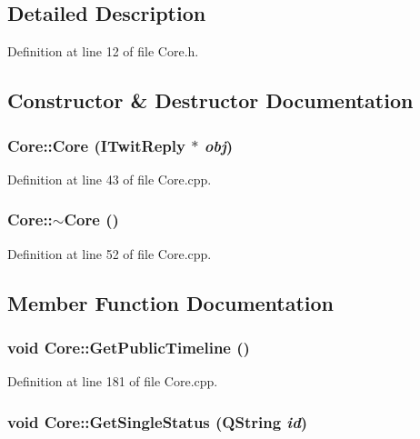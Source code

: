 \subsection{Detailed Description}


Definition at line 12 of file Core.h.

\subsection{Constructor \& Destructor Documentation}
\hypertarget{classCore_4d99e39664e6f9a1b885742f92d83ade}{
\subsubsection{\setlength{\rightskip}{0pt plus 5cm}Core::Core ({\bf ITwitReply} $\ast$ {\em obj})}}
\label{classCore_4d99e39664e6f9a1b885742f92d83ade}




Definition at line 43 of file Core.cpp.\hypertarget{classCore_776f8c46504b14183883c6273f93eaed}{
\subsubsection{\setlength{\rightskip}{0pt plus 5cm}Core::$\sim$Core ()}}
\label{classCore_776f8c46504b14183883c6273f93eaed}




Definition at line 52 of file Core.cpp.

\subsection{Member Function Documentation}
\hypertarget{classCore_e07b32f495c64e768eb74cf50585352c}{
\subsubsection{\setlength{\rightskip}{0pt plus 5cm}void Core::GetPublicTimeline ()}}
\label{classCore_e07b32f495c64e768eb74cf50585352c}




Definition at line 181 of file Core.cpp.\hypertarget{classCore_88d775139d0168f3fa24b4b4fda83386}{
\subsubsection{\setlength{\rightskip}{0pt plus 5cm}void Core::GetSingleStatus (QString {\em id})}}
\label{classCore_88d775139d0168f3fa24b4b4fda83386}




